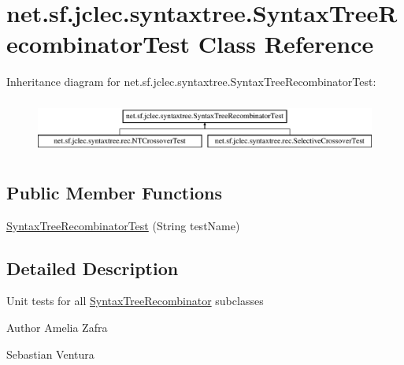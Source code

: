 \hypertarget{classnet_1_1sf_1_1jclec_1_1syntaxtree_1_1_syntax_tree_recombinator_test}{\section{net.\-sf.\-jclec.\-syntaxtree.\-Syntax\-Tree\-Recombinator\-Test Class Reference}
\label{classnet_1_1sf_1_1jclec_1_1syntaxtree_1_1_syntax_tree_recombinator_test}
}
Inheritance diagram for net.\-sf.\-jclec.\-syntaxtree.\-Syntax\-Tree\-Recombinator\-Test\-:\begin{figure}[H]
\begin{center}
\leavevmode
\includegraphics[height=1.794872cm]{classnet_1_1sf_1_1jclec_1_1syntaxtree_1_1_syntax_tree_recombinator_test}
\end{center}
\end{figure}
\subsection*{Public Member Functions}
\begin{DoxyCompactItemize}
\item 
\hyperlink{classnet_1_1sf_1_1jclec_1_1syntaxtree_1_1_syntax_tree_recombinator_test_aa4bd525afc75193bc38ccb88fe6502cf}{Syntax\-Tree\-Recombinator\-Test} (String test\-Name)
\end{DoxyCompactItemize}


\subsection{Detailed Description}
Unit tests for all \hyperlink{classnet_1_1sf_1_1jclec_1_1syntaxtree_1_1_syntax_tree_recombinator}{Syntax\-Tree\-Recombinator} subclasses

\begin{DoxyAuthor}{Author}
Amelia Zafra 

Sebastian Ventura 
\end{DoxyAuthor}


